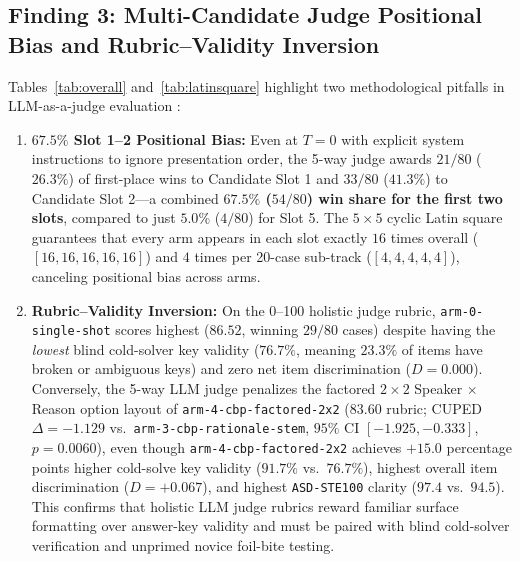 \documentclass[11pt,a4paper]{article}
\begin{document}
\subsection{Finding 3: Multi-Candidate Judge Positional Bias and Rubric--Validity Inversion}
Tables~\ref{tab:overall} and~\ref{tab:latinsquare} highlight two methodological pitfalls in LLM-as-a-judge evaluation \cite{zheng2023judging}:
\begin{enumerate}
  \item \textbf{$67.5\%$ Slot 1--2 Positional Bias:} Even at $T=0$ with explicit system instructions to ignore presentation order, the 5-way judge awards $21/80$ ($26.3\%$) of first-place wins to Candidate Slot 1 and $33/80$ ($41.3\%$) to Candidate Slot 2---a combined \textbf{$67.5\%$ ($54/80$) win share for the first two slots}, compared to just $5.0\%$ ($4/80$) for Slot 5. The $5\times 5$ cyclic Latin square guarantees that every arm appears in each slot exactly $16$ times overall ($[16,16,16,16,16]$) and $4$ times per 20-case sub-track ($[4,4,4,4,4]$), canceling positional bias across arms.
  \item \textbf{Rubric--Validity Inversion:} On the 0--100 holistic judge rubric, \texttt{arm-0-single-shot} scores highest ($86.52$, winning $29/80$ cases) despite having the \emph{lowest} blind cold-solver key validity ($76.7\%$, meaning $23.3\%$ of items have broken or ambiguous keys) and zero net item discrimination ($D = 0.000$). Conversely, the 5-way LLM judge penalizes the factored $2\times 2$ Speaker $\times$ Reason option layout of \texttt{arm-4-cbp-factored-2x2} ($83.60$ rubric; CUPED $\Delta = -1.129$ vs.\ \texttt{arm-3-cbp-rationale-stem}, $95\%$ CI $[-1.925, -0.333]$, $p = 0.0060$), even though \texttt{arm-4-cbp-factored-2x2} achieves $+15.0$ percentage points higher cold-solve key validity ($91.7\%$ vs.\ $76.7\%$), highest overall item discrimination ($D = +0.067$), and highest \texttt{ASD-STE100} clarity ($97.4$ vs.\ $94.5$). This confirms that holistic LLM judge rubrics reward familiar surface formatting over answer-key validity and must be paired with blind cold-solver verification and unprimed novice foil-bite testing.
\end{enumerate}
\end{document}
